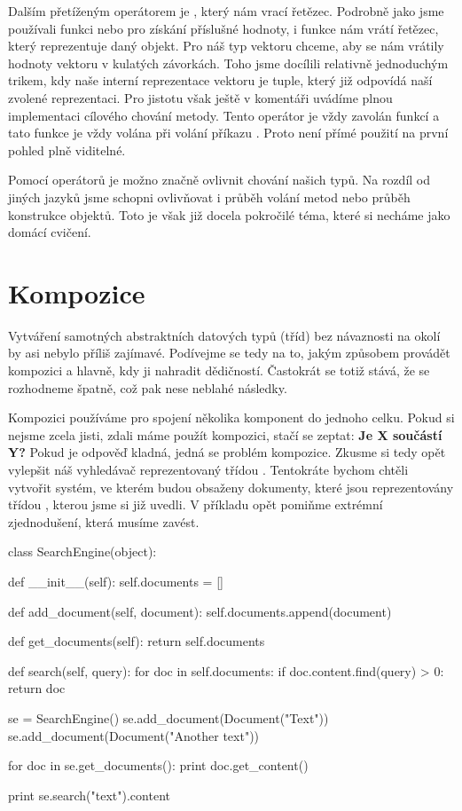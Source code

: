Dalším přetíženým operátorem je , který nám vrací řetězec. Podrobně jako jsme používali
funkci  nebo  pro získání příslušné hodnoty, i funkce  nám vrátí řetězec,
který reprezentuje daný objekt. Pro náš typ vektoru chceme, aby se nám vrátily hodnoty vektoru v kulatých
závorkách. Toho jsme docílili relativně jednoduchým trikem, kdy naše interní reprezentace vektoru je tuple,
který již odpovídá naší zvolené reprezentaci. Pro jistotu však ještě v komentáři uvádíme plnou implementaci
cílového chování metody. Tento operátor je vždy zavolán funkcí  a tato funkce je vždy volána
při volání příkazu . Proto není přímé použití na první pohled plně viditelné.

Pomocí operátorů je možno značně ovlivnit chování našich typů. Na rozdíl od jiných jazyků jsme schopni
ovlivňovat i průběh volání metod nebo průběh konstrukce objektů. Toto je však již docela pokročilé téma,
které si necháme jako domácí cvičení.

\section{Kompozice}

Vytváření samotných abstraktních datových typů (tříd) bez návaznosti na okolí by asi nebylo příliš zajímavé.
Podívejme se tedy na to, jakým způsobem provádět kompozici a hlavně, kdy ji nahradit dědičností. Častokrát
se totiž stává, že se rozhodneme špatně, což pak nese neblahé následky.

Kompozici používáme pro spojení několika komponent do jednoho celku. Pokud si nejsme zcela jisti,
zdali máme použít kompozici, stačí se zeptat: \textbf{Je X součástí Y?} Pokud je odpověď kladná, jedná
se problém kompozice. Zkusme si tedy opět vylepšit náš vyhledávač reprezentovaný třídou .
Tentokráte bychom chtěli vytvořit
systém, ve kterém budou obsaženy dokumenty, které jsou reprezentovány třídou , kterou jsme si
již uvedli. V příkladu opět pomiňme extrémní zjednodušení, která musíme zavést.

\begin{python}
class SearchEngine(object):

    def __init__(self):
        self.documents = []

    def add_document(self, document):
        self.documents.append(document)

    def get_documents(self):
        return self.documents

    def search(self, query):
        for doc in self.documents:
            if doc.content.find(query) > 0:
                return doc

se = SearchEngine()
se.add_document(Document("Text"))
se.add_document(Document("Another text"))

for doc in se.get_documents():
    print doc.get_content()

print se.search("text").content
\end{python}

